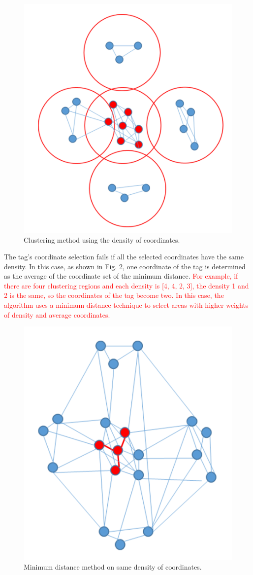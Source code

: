\documentclass[conference]{IEEEtran}
\begin{document}
\begin{figure}[htbp]
    \centerline{\includegraphics[width=0.8\columnwidth]{fig3.png}}
    \caption{Clustering method using the density of coordinates.}
    \label{fig3}
\end{figure}

The tag's coordinate selection fails if all the selected coordinates have the same density. In this case, as shown in Fig. \ref{fig4}, one coordinate of the tag is determined as the average of the coordinate set of the minimum distance. \textcolor{red}{For example, if there are four clustering regions and each density is [4, 4, 2, 3], the density 1 and 2 is the same, so the coordinates of the tag become two. In this case, the algorithm uses a minimum distance technique to select areas with higher weights of density and average coordinates.}


\begin{figure}[htbp]
    \centerline{\includegraphics[width=0.5\columnwidth]{fig4.png}}
    \caption{Minimum distance method on same density of coordinates.}
    \label{fig4}
\end{figure}
\end{document}
